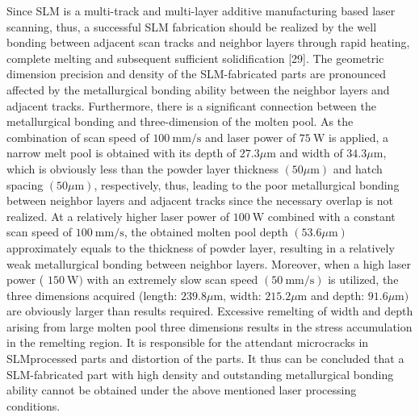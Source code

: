 \documentclass[10pt]{article}
\begin{document}
Since SLM is a multi-track and multi-layer additive manufacturing based laser scanning, thus, a successful SLM fabrication should be realized by the well bonding between adjacent scan tracks and neighbor layers through rapid heating, complete melting and subsequent sufficient solidification [29]. The geometric dimension precision and density of the SLM-fabricated parts are pronounced affected by the metallurgical bonding ability between the neighbor layers and adjacent tracks. Furthermore, there is a significant connection between the metallurgical bonding and three-dimension of the molten pool. As the combination of scan speed of $100 \mathrm{~mm} / \mathrm{s}$ and laser power of $75 \mathrm{~W}$ is applied, a narrow melt pool is obtained with its depth of $27.3 \mu \mathrm{m}$ and width of $34.3 \mu \mathrm{m}$, which is obviously less than the powder layer thickness $(50 \mu \mathrm{m})$ and hatch spacing $(50 \mu \mathrm{m})$, respectively, thus, leading to the poor metallurgical bonding between neighbor layers and adjacent tracks since the necessary overlap is not realized. At a relatively higher laser power of $100 \mathrm{~W}$ combined with a constant scan speed of $100 \mathrm{~mm} / \mathrm{s}$, the obtained molten pool depth $(53.6 \mu \mathrm{m})$ approximately equals to the thickness of powder layer, resulting in a relatively weak metallurgical bonding between neighbor layers. Moreover, when a high laser power ( $150 \mathrm{~W})$ with an extremely slow scan speed $(50 \mathrm{~mm} / \mathrm{s})$ is utilized, the three dimensions acquired (length: $239.8 \mu \mathrm{m}$, width: $215.2 \mu \mathrm{m}$ and depth: $91.6 \mu \mathrm{m})$ are obviously larger than results required. Excessive remelting of width and depth arising from large molten pool three dimensions results in the stress accumulation in the remelting region. It is responsible for the attendant microcracks in SLMprocessed parts and distortion of the parts. It thus can be concluded that a SLM-fabricated part with high density and outstanding metallurgical bonding ability cannot be obtained under the above mentioned laser processing conditions.
\end{document}
